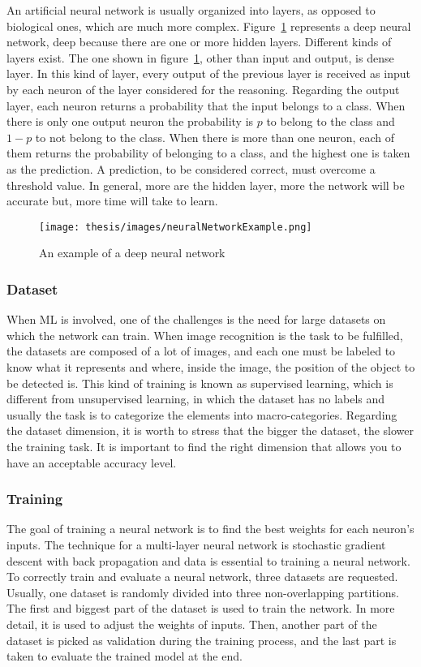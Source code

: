 \documentclass[../thesis.tex]{subfiles}
\begin{document}
An artificial neural network is usually organized into layers, as opposed to biological ones, which are much more complex.  Figure~\ref{fig:neural_network_example} represents a deep neural network, deep because there are one or more hidden layers. Different kinds of layers exist. The one shown in figure~\ref{fig:neural_network_example}, other than input and output, is dense layer. In this kind of layer, every output of the previous layer is received as input by each neuron of the layer considered for the reasoning. Regarding the output layer, each neuron returns a probability that the input belongs to a class. When there is only one output neuron the probability is $p$ to belong to the class and $1-p$ to not belong to the class. When there is more than one neuron, each of them returns the probability of belonging to a class, and the highest one is taken as the prediction. A prediction, to be considered correct, must overcome a threshold value. In general, more are the hidden layer, more the network will be accurate but, more time will take to learn. 

\begin{figure}[H]
    \centering
    \texttt{[image: thesis/images/neuralNetworkExample.png]}
    \caption{An example of a deep neural network}
    \label{fig:neural_network_example}
\end{figure}

\subsubsection{Dataset}
When \acrshort{ML} is involved, one of the challenges is the need for large datasets on which the network can train. When image recognition is the task to be fulfilled, the datasets are composed of a lot of images, and each one must be labeled to know what it represents and where, inside the image, the position of the object to be detected is. This kind of training is known as supervised learning, which is different from unsupervised learning, in which the dataset has no labels and usually the task is to categorize the elements into macro-categories. Regarding the dataset dimension, it is worth to stress that the bigger the dataset, the slower the training task. It is important to find the right dimension that allows you to have an acceptable accuracy level. 

\subsubsection{Training}
The goal of training a neural network is to find the best weights for each neuron’s inputs. The technique for a multi-layer neural network is stochastic gradient descent with back propagation and data is essential to training a neural network. To correctly train and evaluate a neural network, three datasets are requested. Usually, one dataset is randomly divided into three non-overlapping partitions. The first and biggest part of the dataset is used to train the network. In more detail, it is used to adjust the weights of inputs. Then, another part of the dataset is picked as validation during the training process, and the last part is taken to evaluate the trained model at the end.
\end{document}
